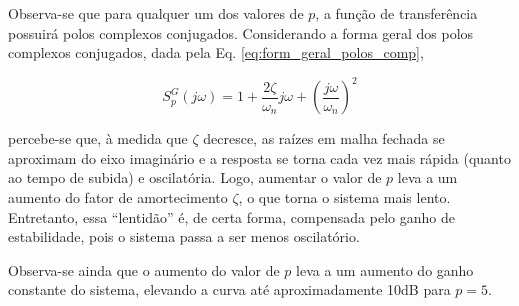 Observa-se que para qualquer um dos valores de $p$, a função de transferência
possuirá polos complexos conjugados. Considerando a forma geral dos polos
complexos conjugados, dada pela Eq. \ref{eq:form_geral_polos_comp}, 

\begin{equation}\label{eq:form_geral_polos_comp}
S_p^G(j\omega) = 1 + 
                 \frac{2\zeta}{\omega_n}j\omega + 
                 \left(\frac{j\omega}{\omega_n}\right)^2
\end{equation}

\noindent percebe-se que, à medida que $\zeta$ decresce, as raízes em malha
fechada se aproximam do eixo imaginário e a resposta se torna cada vez mais
rápida (quanto ao tempo de subida) e oscilatória. Logo, aumentar o valor de $p$
leva a um aumento do fator de amortecimento $\zeta$, o que torna o sistema mais
lento.  Entretanto, essa ``lentidão'' é, de certa forma, compensada pelo ganho
de estabilidade, pois o sistema passa a ser menos oscilatório.

Observa-se ainda que o aumento do valor de $p$ leva a um aumento do ganho constante
do sistema, elevando a curva até aproximadamente 10dB para $p = 5$.
